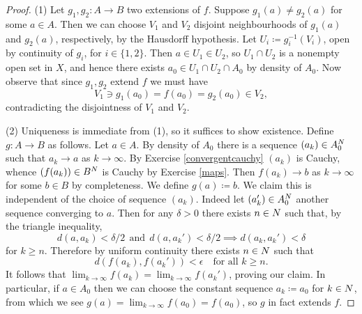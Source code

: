 \begin{proof}
  (1) Let $g_1,g_2 : A \to B$ two extensions of $f$. Suppose $g_1(a)
  \ne g_2(a)$ for some $a \in A$. Then we can choose $V_1$ and $V_2$
  disjoint neighbourhoods of $g_1(a)$ and $g_2(a)$, respectively, by
  the Hausdorff hypothesis. Let $U_i \coloneqq g_i^{-1}(V_i)$, open by
  continuity of $g_i$, for $i \in \{1,2\}$. Then $a \in U_1 \in U_2$,
  so $U_1 \cap U_2$ is a nonempty open set in $X$, and hence there
  exists $a_0 \in U_1 \cap U_2 \cap A_0$ by density of $A_0$. Now
  observe that since $g_1,g_2$ extend $f$ we must have
  \[
  V_1 \ni g_1(a_0) = f(a_0) = g_2(a_0) \in V_2,
  \]
  contradicting the disjointness of $V_1$ and $V_2$.

  (2) Uniqueness is immediate from (1), so it suffices to show
  existence. Define $g : A \to B$ as follows. Let $a \in A$. By
  density of $A_0$ there is a sequence $(a_k) \in A_0^N$ such that
  $a_k \to a$ as $k \to \infty$. By Exercise \ref{convergentcauchy}
  $(a_k)$ is Cauchy, whence $(f(a_k)) \in B^N$ is Cauchy by Exercise
  \ref{maps}. Then $f(a_k) \to b$ as $k \to \infty$ for some $b \in B$
  by completeness. We define $g(a) \coloneqq b$. We claim this is
  independent of the choice of sequence $(a_k)$. Indeed let $(a_k')
  \in A_0^N$ another sequence converging to $a$. Then for any $\delta
  > 0$ there exists $n \in N$ such that, by the triangle inequality,
  \[
  d(a,a_k) < \delta/2\ \ \text{and}\ \ d(a,a_k') < \delta/2 \implies
  d(a_k,a_k') < \delta
  \]
  for $k \ge n$. Therefore by uniform continuity there exists $n \in
  N$ such that
  \[
  d(f(a_k),f(a_k')) < \epsilon \quad\text{for all }k \ge n.
  \]
  It follows that $\lim_{k \to \infty} f(a_k) = \lim_{k \to \infty}
  f(a_k')$, proving our claim. In particular, if $a \in A_0$ then we
  can choose the constant sequence $a_k \coloneqq a_0$ for $k \in N$,
  from which we see $g(a) = \lim_{k \to \infty} f(a_0) = f(a_0)$, so
  $g$ in fact extends $f$.


\end{proof}
